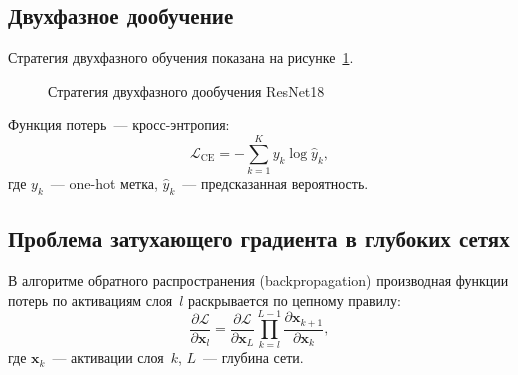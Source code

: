 \documentclass[10pt,a4paper]{report}
\numberwithin{equation}{chapter}
\numberwithin{figure}{chapter}
\numberwithin{table}{chapter}
\begin{document}
\subsection{Двухфазное дообучение}

Стратегия двухфазного обучения показана на рисунке~\ref{fig:twophase}.

\begin{figure}[H]
\centering
{}
\caption{Стратегия двухфазного дообучения ResNet18}
\label{fig:twophase}
\end{figure}

Функция потерь~--- кросс-энтропия:
\begin{equation}
  \mathcal{L}_{\mathrm{CE}} = -\sum_{k=1}^{K} y_k \log \hat{y}_k,
\end{equation}
где $y_k$~--- one-hot метка, $\hat{y}_k$~--- предсказанная вероятность.

\subsection{Проблема затухающего градиента в глубоких сетях}

В алгоритме обратного распространения (backpropagation) производная
функции потерь по активациям слоя~$l$ раскрывается по цепному правилу:
\begin{equation}
  \frac{\partial\mathcal{L}}{\partial\mathbf{x}_l} =
  \frac{\partial\mathcal{L}}{\partial\mathbf{x}_L}
  \prod_{k=l}^{L-1}
  \frac{\partial\mathbf{x}_{k+1}}{\partial\mathbf{x}_k},
\end{equation}
где $\mathbf{x}_k$~--- активации слоя~$k$, $L$~--- глубина сети.
\end{document}
